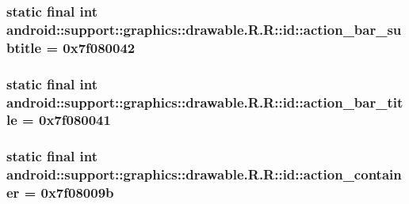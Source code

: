 \hypertarget{classandroid_1_1support_1_1graphics_1_1drawable_1_1_r_1_1id_08acef022cf9939a5d98899d47fa7977}{
\subsubsection[{action\_\-bar\_\-subtitle}]{\setlength{\rightskip}{0pt plus 5cm}static final int android::support::graphics::drawable.R.R::id::action\_\-bar\_\-subtitle = 0x7f080042}}
\label{classandroid_1_1support_1_1graphics_1_1drawable_1_1_r_1_1id_08acef022cf9939a5d98899d47fa7977}


\hypertarget{classandroid_1_1support_1_1graphics_1_1drawable_1_1_r_1_1id_6ea1f3aeb62211643570b7160d010284}{
\subsubsection[{action\_\-bar\_\-title}]{\setlength{\rightskip}{0pt plus 5cm}static final int android::support::graphics::drawable.R.R::id::action\_\-bar\_\-title = 0x7f080041}}
\label{classandroid_1_1support_1_1graphics_1_1drawable_1_1_r_1_1id_6ea1f3aeb62211643570b7160d010284}


\hypertarget{classandroid_1_1support_1_1graphics_1_1drawable_1_1_r_1_1id_47bb5669bb5922383d5c08b2a345d2df}{
\subsubsection[{action\_\-container}]{\setlength{\rightskip}{0pt plus 5cm}static final int android::support::graphics::drawable.R.R::id::action\_\-container = 0x7f08009b}}
\label{classandroid_1_1support_1_1graphics_1_1drawable_1_1_r_1_1id_47bb5669bb5922383d5c08b2a345d2df}


